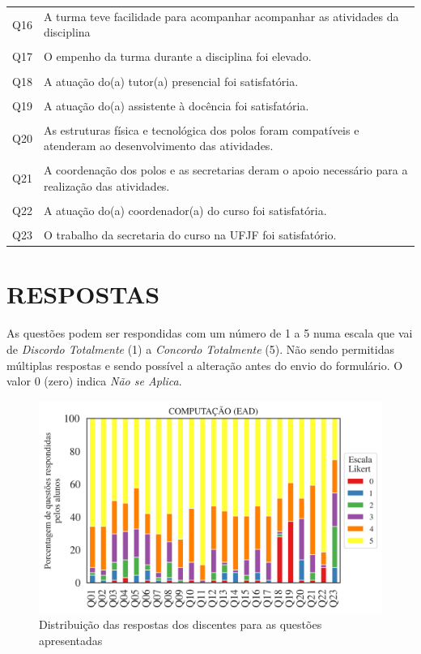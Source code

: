 \documentclass[a4paper,10pt]{article}
\begin{document}
{\begin{center}
\begin{tabularx}{\linewidth}{c|X}
Q16&A turma teve facilidade para acompanhar acompanhar as atividades da disciplina\\\\
Q17&O empenho da turma durante a disciplina foi elevado.\\\\
Q18&A atuação do(a) tutor(a) presencial foi satisfatória.\\\\
Q19&A atuação do(a) assistente à docência foi satisfatória.\\\\
Q20&As estruturas física e tecnológica dos polos foram compatíveis e atenderam ao desenvolvimento das atividades.\\\\
Q21&A coordenação dos polos e as secretarias deram o apoio necessário para a realização das atividades.\\\\
Q22&A atuação do(a) coordenador(a) do curso foi satisfatória.\\\\
Q23&O trabalho da secretaria do curso na UFJF foi satisfatório.
\end{tabularx}
\end{center}
}
\section{RESPOSTAS}
As questões podem ser respondidas com um número de 1 a 5 numa escala que vai de {\it Discordo Totalmente} (1) a {\it Concordo Totalmente} (5). Não sendo permitidas múltiplas respostas e sendo possível a alteração antes do envio do formulário. O valor 0 (zero) indica {\it Não se Aplica}.

\begin{figure}[h]
\centering
\includegraphics[width=0.85\linewidth]{resposta_questoes_curso_1132188}
\caption{\label{fig:qalunos}Distribuição das respostas dos discentes para as questões apresentadas}
\end{figure}
\end{document}
